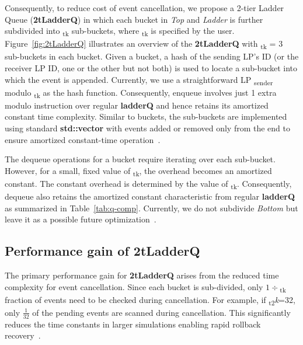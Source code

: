 Consequently, to reduce cost of event cancellation, we propose a 2-tier Ladder Queue (\textbf{2tLadderQ}) in which each bucket in \emph{Top} and \emph{Ladder} is further subdivided into \textsubscript{tk} sub-buckets, where \textsubscript{tk} is specified by the user. Figure~\ref{fig:2tLadderQ} illustrates an overview of the \textbf{2tLadderQ} with \textsubscript{tk} = 3 sub-buckets in each bucket. Given a bucket, a hash of the sending LP's ID (or the receiver LP ID, one or the other but not both) is used to locate a sub-bucket into which the event is appended. Currently, we use a straightforward LP \textsubscript{sender} modulo \textsubscript{tk} as the hash function. Consequently, enqueue involves just 1 extra modulo
instruction over regular \textbf{ladderQ} and hence retains its amortized constant time complexity. Similar to buckets, the sub-buckets are implemented using standard \textbf{std::vector} with events added or
removed only from the end to ensure amortized constant-time operation~\cite{higiro2017multi}.

The dequeue operations for a bucket require iterating over each sub-bucket.  However, for a small, fixed value of \textsubscript{tk}, the overhead becomes an amortized constant.  The constant overhead is determined by the value of \textsubscript{tk}. Consequently, dequeue also retains the amortized constant characteristic from regular \textbf{ladderQ} as summarized in Table~\ref{tab:q-comp}. Currently, we do not subdivide \emph{Bottom} but leave it as a possible future optimization~\cite{higiro2017multi}.

\subsection{Performance gain of 2tLadderQ}

The primary performance gain for \textbf{2tLadderQ} arises from the reduced time complexity for event cancellation. Since each bucket is sub-divided, only $1\div$\textsubscript{tk} fraction of events need to be checked during cancellation. For example, if \textsubscript{t2}\textit{k}=32, only $\frac{1}{32}$ of the pending events are scanned during cancellation. This significantly reduces the time constants in larger simulations enabling rapid rollback recovery~\cite{higiro2017multi}.

